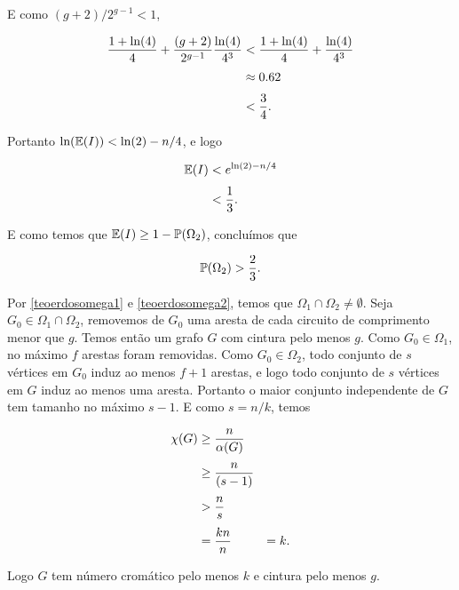 E como $(g+2)/2^{g-1} < 1$, 

\begin{equation*}
\setlength{\jot}{6pt}
\begin{aligned}
\frac{1+\text{ln}(4)}{4} + \frac{(g+2)}{2^{g-1}}\frac{\text{ln}(4)}{4^3} &< \frac{1+\text{ln}(4)}{4} + \frac{\text{ln}(4)}{4^3} \\
&\approx 0.62 \\
&< \frac{3}{4}.
\end{aligned}
\end{equation*}

Portanto $\text{ln}(\mathbb{E}(I)) < \text{ln}(2) - n/4$, e logo

\begin{equation*}
\setlength{\jot}{6pt}
\begin{aligned}
\bbe(I) &< e^{\text{ln}(2)-n/4} \\
&< \frac{1}{3}.
\end{aligned}
\end{equation*}

E como temos que $\mathbb{E}(I) \geq 1 - \mathbb{P}(\Omega_2)$, concluímos que

\begin{equation}\label{teoerdosomega2}
\mathbb{P}(\Omega_2) > \frac{2}{3}.
\end{equation}

Por \ref{teoerdosomega1} e \ref{teoerdosomega2}, temos que $\Omega_1 \cap \Omega_2 \neq \emptyset$. Seja $G_0 \in \Omega_1 \cap \Omega_2$, removemos de $G_0$ uma aresta de cada circuito de comprimento menor que $g$. Temos então um grafo $G$ com cintura pelo menos $g$. Como $G_0 \in \Omega_1$, no máximo $f$ arestas foram removidas. Como $G_0 \in \Omega_2$, todo conjunto de $s$ vértices em $G_0$ induz ao menos $f+1$ arestas, e logo todo conjunto de $s$ vértices em $G$ induz ao menos uma aresta. Portanto o maior conjunto independente de $G$ tem tamanho no máximo $s-1$. E como $s = n/k$, temos

\begin{equation*}
\setlength{\jot}{6pt}
\begin{aligned}
\chi(G) &\geq \frac{n}{\alpha(G)} \\
&\geq \frac{n}{(s-1)} \\
&> \frac{n}{s}\\
&= \frac{kn}{n} & = k.
\end{aligned}
\end{equation*}

Logo $G$ tem número cromático pelo menos $k$ e cintura pelo menos $g$.

